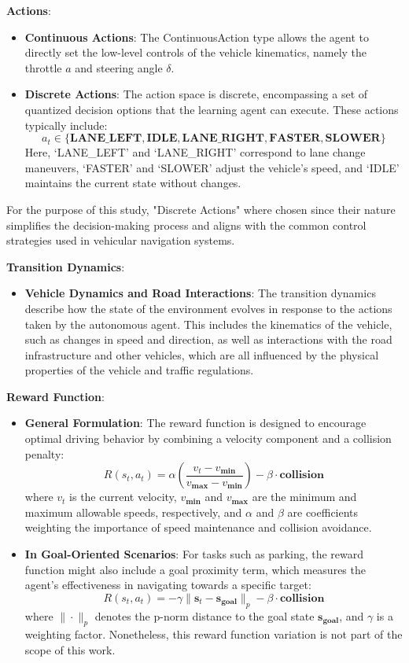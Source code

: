 \documentclass{article}
\begin{document}
\textbf{Actions}:
\begin{itemize}
  \item \textbf{Continuous Actions}: The ContinuousAction type allows the agent to directly set the low-level controls of the vehicle kinematics, namely the throttle $a$ and steering angle $\delta$.
  \item \textbf{Discrete Actions}: The action space is discrete, encompassing a set of quantized decision options that the learning agent can execute. These actions typically include:
    \[
    a_t \in \{\mathbf{LANE\_LEFT}, \mathbf{IDLE}, \mathbf{LANE\_RIGHT}, \mathbf{FASTER}, \mathbf{SLOWER}\}
    \]
  Here, `LANE\_LEFT' and `LANE\_RIGHT' correspond to lane change maneuvers, `FASTER' and `SLOWER' adjust the vehicle's speed, and `IDLE' maintains the current state without changes.
\end{itemize}

For the purpose of this study, "Discrete Actions" where chosen since their nature simplifies the decision-making process and aligns with the common control strategies used in vehicular navigation systems.

\textbf{Transition Dynamics}:
\begin{itemize}
  \item \textbf{Vehicle Dynamics and Road Interactions}: The transition dynamics describe how the state of the environment evolves in response to the actions taken by the autonomous agent. This includes the kinematics of the vehicle, such as changes in speed and direction, as well as interactions with the road infrastructure and other vehicles, which are all influenced by the physical properties of the vehicle and traffic regulations.
\end{itemize}

\textbf{Reward Function}:
\begin{itemize}
  \item \textbf{General Formulation}: The reward function is designed to encourage optimal driving behavior by combining a velocity component and a collision penalty:
    \[
    R(s_t, a_t) = \alpha \left(\frac{v_t - v_{\mathbf{min}}}{v_{\mathbf{max}} - v_{\mathbf{min}}}\right) - \beta \cdot \mathbf{collision}
    \]
  where $v_t$ is the current velocity, $v_{\mathbf{min}}$ and $v_{\mathbf{max}}$ are the minimum and maximum allowable speeds, respectively, and $\alpha$ and $\beta$ are coefficients weighting the importance of speed maintenance and collision avoidance.
  
  \item \textbf{In Goal-Oriented Scenarios}: For tasks such as parking, the reward function might also include a goal proximity term, which measures the agent's effectiveness in navigating towards a specific target:
    \[
    R(s_t, a_t) = -\gamma \|\mathbf{s}_t - \mathbf{s}_{\mathbf{goal}}\|_p - \beta \cdot \mathbf{collision}
    \]
  where $\|\cdot\|_p$ denotes the p-norm distance to the goal state $\mathbf{s}_{\mathbf{goal}}$, and $\gamma$ is a weighting factor. Nonetheless, this reward function variation is not part of the scope of this work.
\end{itemize}
\end{document}
